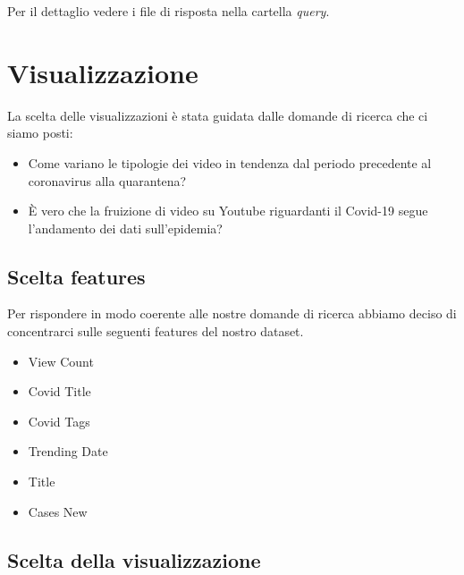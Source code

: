 \documentclass[10pt, a4paper,openany]{article}
\begin{document}
	Per il dettaglio vedere i file di risposta nella cartella \textit{query}.


\section*{Visualizzazione}

La scelta delle visualizzazioni è stata guidata dalle domande di ricerca che ci siamo posti: 
\begin{itemize}
	\item Come variano le tipologie dei video in tendenza dal periodo precedente al coronavirus alla quarantena?
	\item È vero che la fruizione di video su Youtube riguardanti il Covid-19 segue l'andamento dei dati sull'epidemia?
\end{itemize}

\subsection*{Scelta features}
Per rispondere in modo coerente alle nostre domande di ricerca abbiamo deciso di concentrarci sulle seguenti features del nostro dataset.
\begin{itemize}
	\item View Count
	\item Covid Title
	\item Covid Tags
	\item Trending Date
	\item Title
	\item Cases New
\end{itemize}

\subsection*{Scelta della visualizzazione}
\end{document}
